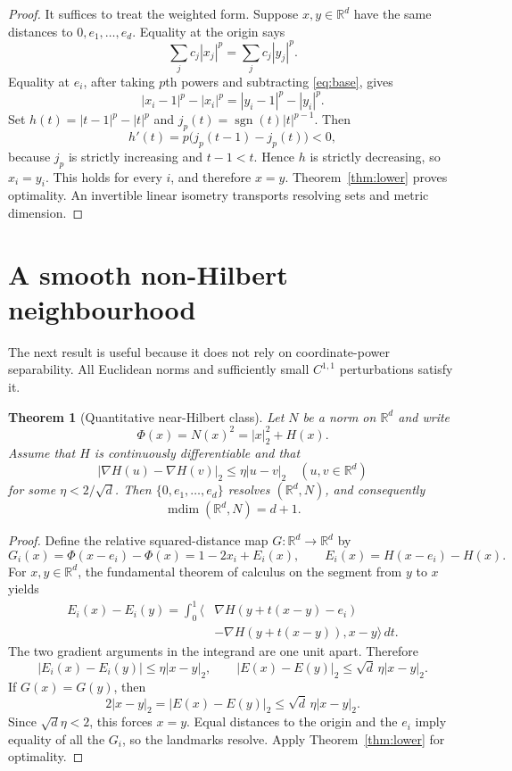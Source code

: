 \documentclass[11pt]{amsart}
\newtheorem{theorem}{Theorem}
\theoremstyle{remark}
\newcommand{\R}{\mathbb R}
\newcommand{\mdim}{\operatorname{mdim}}
\begin{document}
\begin{proof}
It suffices to treat the weighted form.  Suppose $x,y\in\R^d$ have the same
distances to $0,e_1,\dots,e_d$.  Equality at the origin says
\begin{equation}\label{eq:base}
 \sum_j c_j|x_j|^p=\sum_j c_j|y_j|^p.
\end{equation}
Equality at $e_i$, after taking $p$th powers and subtracting
\eqref{eq:base}, gives
\[
 |x_i-1|^p-|x_i|^p=|y_i-1|^p-|y_i|^p.
\]
Set $h(t)=|t-1|^p-|t|^p$ and
$j_p(t)=\operatorname{sgn}(t)|t|^{p-1}$.  Then
\[
 h'(t)=p\bigl(j_p(t-1)-j_p(t)\bigr)<0,
\]
because $j_p$ is strictly increasing and $t-1<t$.  Hence $h$ is strictly
decreasing, so $x_i=y_i$.  This holds for every $i$, and therefore $x=y$.
Theorem~\ref{thm:lower} proves optimality.  An invertible linear isometry
transports resolving sets and metric dimension.
\end{proof}

\section{A smooth non-Hilbert neighbourhood}

The next result is useful because it does not rely on coordinate-power
separability.  All Euclidean norms and sufficiently small $C^{1,1}$
perturbations satisfy it.

\begin{theorem}[Quantitative near-Hilbert class]\label{thm:near}
Let $N$ be a norm on $\R^d$ and write
\[
 \Phi(x)=N(x)^2=|x|_2^2+H(x).
\]
Assume that $H$ is continuously differentiable and that
\[
 |\nabla H(u)-\nabla H(v)|_2\le\eta|u-v|_2
 \quad(u,v\in\R^d)
\]
for some $\eta<2/\sqrt d$.  Then $\{0,e_1,\dots,e_d\}$ resolves
$(\R^d,N)$, and consequently
\[
 \mdim(\R^d,N)=d+1.
\]
\end{theorem}

\begin{proof}
Define the relative squared-distance map $G:\R^d\to\R^d$ by
\[
 G_i(x)=\Phi(x-e_i)-\Phi(x)=1-2x_i+E_i(x),
 \qquad E_i(x)=H(x-e_i)-H(x).
\]
For $x,y\in\R^d$, the fundamental theorem of calculus on the segment from
$y$ to $x$ yields
\begin{align*}
 E_i(x)-E_i(y)
  =\int_0^1\!\langle
  &\nabla H(y+t(x-y)-e_i)\\
  &-\nabla H(y+t(x-y)),x-y\rangle\,dt.
\end{align*}
The two gradient arguments in the integrand are one unit apart.  Therefore
\[
 |E_i(x)-E_i(y)|\le\eta|x-y|_2,
 \qquad |E(x)-E(y)|_2\le\sqrt d\,\eta|x-y|_2.
\]
If $G(x)=G(y)$, then
\[
 2|x-y|_2=|E(x)-E(y)|_2
 \le\sqrt d\,\eta|x-y|_2.
\]
Since $\sqrt d\eta<2$, this forces $x=y$.  Equal distances to the origin and
the $e_i$ imply equality of all the $G_i$, so the landmarks resolve.  Apply
Theorem~\ref{thm:lower} for optimality.
\end{proof}
\end{document}
